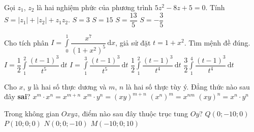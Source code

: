 \begin{ex}%
	Gọi $z_1$, $z_2$ là hai nghiệm phức của phương trình $5z^2-8z+5=0$. Tính $S=|z_1|+|z_2|+z_1z_2$.
	\choice
	{\True $S=3 $}
	{$S=15 $}
	{$S=\dfrac{13}{5} $}
	{$S=-\dfrac{3}{5} $}
\end{ex}
\begin{ex}%
	Cho tích phân $I=\displaystyle \int\limits_0^1\dfrac{x^7}{\left(1+x^2\right)^5}\mathrm{\,d}x$, giả sử đặt $t=1+x^2$. Tìm mệnh đề đúng.
	\choice
	{\True $I=\dfrac{1}{2} \displaystyle \int\limits_1^2 \dfrac{(t-1)^3}{t^5}\mathrm{\,d}t $}
	{$I=\displaystyle \int\limits_1^3 \dfrac{(t-1)^3}{t^5}\mathrm{\,d}t $}
	{$\dfrac{1}{2} \displaystyle \int\limits_1^2\dfrac{(t-1)^3}{t^4}\mathrm{\,d}t $}
	{$\dfrac{3}{2} \displaystyle \int\limits_1^4\dfrac{(t-1)^3}{t^4}\mathrm{\,d}t $}
\end{ex}
\begin{ex}%
	Cho $x$, $y$ là hai số thực dương và $m$, $n$ là hai số thực tùy ý. Đẳng thức nào sau đây \textbf{sai}?
	\choice
	{$x^m\cdot x^n=x^{m+n} $}
	{\True $x^m\cdot y^n=\left(xy\right)^{m+n} $}
	{$\left(x^n\right)^m=x^{nm} $}
	{$\left(xy\right)^n=x^n\cdot y^n $}
\end{ex}
\begin{ex}%
	Trong không gian $Oxyz$, điểm nào sau đây thuộc trục tung $Oy$?
	\choice
	{\True $Q(0;-10;0) $}
	{$P(10;0;0) $}
	{$N(0;0;-10) $}
	{$M(-10;0;10) $}
\end{ex}
